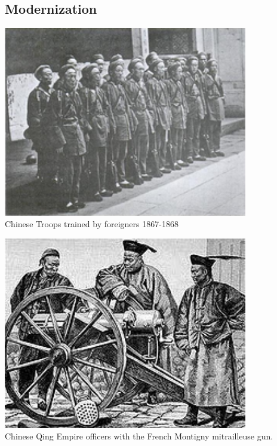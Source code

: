 \documentclass[compress]{beamer}
\begin{document}
\begin{frame}
\section{Modernization}
\begin{center}
\includegraphics[width = 0.80\textwidth]{military-en/k.png} \\
Chinese Troops trained by foreigners 1867-1868
\end{center}
\end{frame}

\begin{frame}
\begin{center}
\includegraphics[width = 0.80\textwidth]{military-en/l.jpg} \\
Chinese Qing Empire officers with the French Montigny mitrailleuse gun.
\end{center}
\end{frame}
\end{document}
